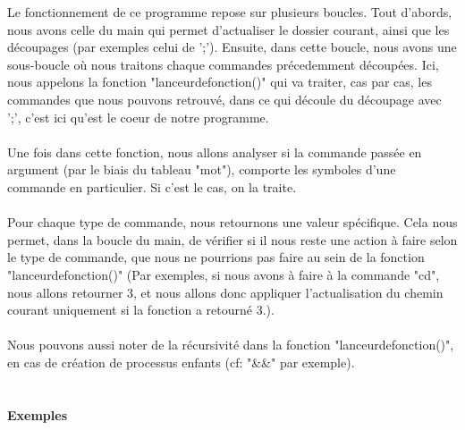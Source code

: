 \documentclass [12pt]{article}
\begin{document}
Le fonctionnement de ce programme repose sur plusieurs boucles. Tout d'abords, nous avons celle du main qui permet d'actualiser le dossier courant, ainsi que les découpages (par exemples celui de ';'). Ensuite, dans cette boucle, nous avons une sous-boucle où nous traitons chaque commandes précedemment découpées. Ici, nous appelons la fonction "lanceurdefonction()" qui va traiter, cas par cas, les commandes que nous pouvons retrouvé, dans ce qui découle du découpage avec ';', c'est ici qu'est le coeur de notre programme.\\\\
Une fois dans cette fonction, nous allons analyser si la commande passée en argument (par le biais du tableau "mot"), comporte les symboles d'une commande en particulier. Si c'est le cas, on la traite.\\\\
Pour chaque type de commande, nous retournons une valeur spécifique. Cela nous permet, dans la boucle du main, de vérifier si il nous reste une action à faire selon le type de commande, que nous ne pourrions pas faire au sein de la fonction "lanceurdefonction()" (Par exemples, si nous avons à faire à la commande "cd", nous allons retourner 3, et nous allons donc appliquer l'actualisation du chemin courant uniquement si la fonction a retourné 3.).\\\\
Nous pouvons aussi noter de la récursivité dans la fonction "lanceurdefonction()", en cas de création de processus enfants (cf: "\&\&" par exemple).
\textbf {\\\\\\\Large Exemples\\}
\end{document}
